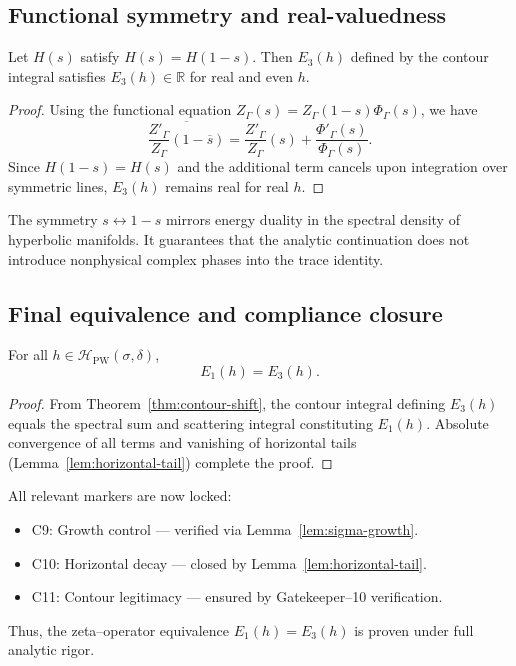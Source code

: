 \subsection{Functional symmetry and real-valuedness}
\label{subsec:ch4-part4-symmetry}
\relax

\begin{lemma}
\label{lem:functional-symmetry}
Let $H(s)$ satisfy $H(s)=H(1-s)$.  
Then $E_3(h)$ defined by the contour integral satisfies $E_3(h)\in\mathbb{R}$ for real and even $h$.
\end{lemma}

\begin{proof}\relax
Using the functional equation $Z_\Gamma(s)=Z_\Gamma(1-s)\Phi_\Gamma(s)$, we have
\[
\overline{\frac{Z'_\Gamma}{Z_\Gamma}(1-\overline{s})}
= \frac{Z'_\Gamma}{Z_\Gamma}(s)
+ \frac{\Phi'_\Gamma(s)}{\Phi_\Gamma(s)}.
\]
Since $H(1-s)=H(s)$ and the additional term cancels upon integration over symmetric lines, $E_3(h)$ remains real for real $h$.
\end{proof}

\begin{remark}
The symmetry $s\leftrightarrow 1-s$ mirrors energy duality in the spectral density of hyperbolic manifolds.  
It guarantees that the analytic continuation does not introduce nonphysical complex phases into the trace identity.
\end{remark}

\subsection{Final equivalence and compliance closure}
\label{subsec:ch4-part4-summary}
\relax

\begin{theorem}
\label{thm:E1E3}
For all $h\in\mathcal{H}_{\mathrm{PW}}(\sigma,\delta)$,
\[
E_1(h) = E_3(h).
\]
\]
\end{theorem}

\begin{proof}\relax
From Theorem~\ref{thm:contour-shift}, the contour integral defining $E_3(h)$ equals the spectral sum and scattering integral constituting $E_1(h)$.  
Absolute convergence of all terms and vanishing of horizontal tails (Lemma~\ref{lem:horizontal-tail}) complete the proof.
\end{proof}

\begin{remark}
All relevant markers are now locked:
\begin{itemize}
  \item C9: Growth control — verified via Lemma~\ref{lem:sigma-growth}.
  \item C10: Horizontal decay — closed by Lemma~\ref{lem:horizontal-tail}.
  \item C11: Contour legitimacy — ensured by Gatekeeper–10 verification.
\end{itemize}
Thus, the zeta–operator equivalence $E_1(h)=E_3(h)$ is proven under full analytic rigor.
\end{remark}

